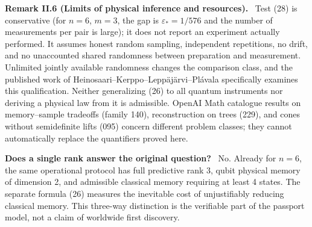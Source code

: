 \documentclass[11pt,a4paper,oneside]{book}
\newcommand{\statement}[3]{\par\medskip\noindent\textbf{#1 #2 (#3).}\ }
\newcommand{\note}[1]{\par\medskip\noindent\textbf{#1}\ }
\begin{document}
\statement{Remark}{II.6}{Limits of physical inference and resources} Test (28) is conservative (for $n=6$, $m=3$, the gap is $\varepsilon_*=1/576$ and the number of measurements per pair is large); it does not report an experiment actually performed. It assumes honest random sampling, independent repetitions, no drift, and no unaccounted shared randomness between preparation and measurement. Unlimited jointly available randomness changes the comparison class, and the published work of Heinosaari--Kerppo--Lepp\"aj\"arvi--Pl\'avala specifically examines this qualification. Neither generalizing (26) to all quantum instruments nor deriving a physical law from it is admissible. OpenAI Math catalogue results on memory--sample tradeoffs (family 140), reconstruction on trees (229), and cones without semidefinite lifts (095) concern different problem classes; they cannot automatically replace the quantifiers proved here.
\note{Does a single rank answer the original question?} No. Already for $n=6$, the same operational protocol has full predictive rank 3, qubit physical memory of dimension 2, and admissible classical memory requiring at least 4 states. The separate formula (26) measures the inevitable cost of unjustifiably reducing classical memory. This three-way distinction is the verifiable part of the passport model, not a claim of worldwide first discovery.
\end{document}
